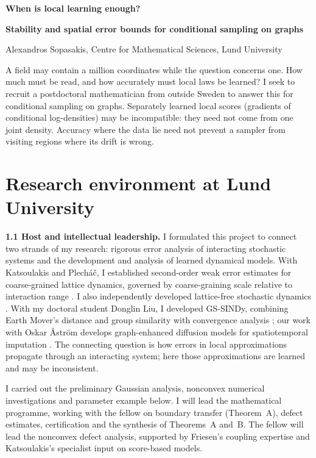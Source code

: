 \documentclass[12pt,a4paper]{article}
\begin{document}
{\LARGE\bfseries When is local learning enough?\par}
\vspace{3pt}
{\large\bfseries Stability and spatial error bounds for conditional sampling on graphs\par}
\vspace{4pt}
Alexandros Sopasakis, Centre for Mathematical Sciences, Lund University

A field may contain a million coordinates while the question concerns one. How much must be read, and how accurately must local laws be learned? I seek to recruit a postdoctoral mathematician from outside Sweden to answer this for conditional sampling on graphs. Separately learned local scores (gradients of conditional log-densities) may be incompatible: they need not come from one joint density. Accuracy where the data lie need not prevent a sampler from visiting regions where its drift is wrong.

\section{Research environment at Lund University}
\textbf{1.1 Host and intellectual leadership.}
I formulated this project to connect two strands of my research: rigorous error analysis of interacting stochastic systems and the development and analysis of learned dynamical models. With Katsoulakis and Plech\'a\v{c}, I established second-order weak error estimates for coarse-grained lattice dynamics, governed by coarse-graining scale relative to interaction range \cite{KPS06}. I also independently developed lattice-free stochastic dynamics \cite{Sop12}. With my doctoral student Donglin Liu, I developed GS-SINDy, combining Earth Mover's distance and group similarity with convergence analysis \cite{LS25}; our work with Oskar \AA{}str\"om develops graph-enhanced diffusion models for spatiotemporal imputation \cite{LAS25}. The connecting question is how errors in local approximations propagate through an interacting system; here those approximations are learned and may be inconsistent.

I carried out the preliminary Gaussian analysis, nonconvex numerical investigations and parameter example below. I will lead the mathematical programme, working with the fellow on boundary transfer (Theorem~A), defect estimates, certification and the synthesis of Theorems~A and~B. The fellow will lead the nonconvex defect analysis, supported by Friesen's coupling expertise and Katsoulakis's specialist input on score-based models.
\end{document}
